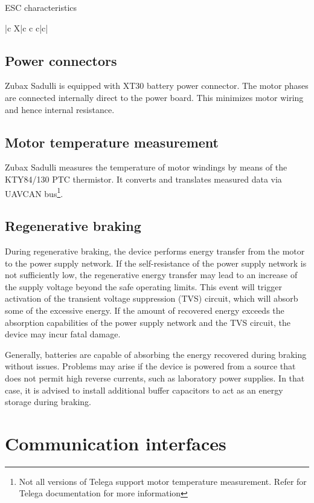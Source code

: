\documentclass{zubaxdoc}
\begin{document}
\begin{ZubaxTableWrapper}{ESC characteristics}
\begin{ZubaxWrappedTable}{|c X|c c c|c|}
    \end{ZubaxWrappedTable}

\end{ZubaxTableWrapper}

\subsection{Power connectors}

Zubax Sadulli is equipped with XT30 battery power connector. 
The motor phases are connected internally direct to the power board. This minimizes motor wiring and hence internal resistance. 

\subsection{Motor temperature measurement}

Zubax Sadulli measures the temperature of motor windings by means of the KTY84/130 PTC thermistor. It converts and translates measured data via UAVCAN bus\footnote{Not all versions of Telega support motor temperature measurement. Refer for Telega documentation for more information}.  

\subsection{Regenerative braking}

During regenerative braking, the device performs energy transfer from the motor to the power supply network.
If the self-resistance of the power supply network is not sufficiently low,
the regenerative energy transfer may lead to an increase of the supply voltage beyond
the safe operating limits.
This event will trigger activation of the transient voltage suppression (TVS) circuit,
which will absorb some of the excessive energy.
If the amount of recovered energy exceeds the absorption capabilities of the power supply
network and the TVS circuit, the device may incur fatal damage.

Generally, batteries are capable of absorbing the energy recovered during braking without issues.
Problems may arise if the device is powered from a source that does not permit high reverse currents,
such as laboratory power supplies.
In that case, it is advised to install additional buffer capacitors to act as an energy storage
during braking.

\section{Communication interfaces}
\end{document}

